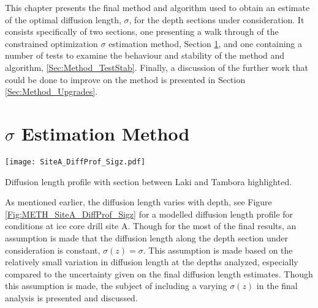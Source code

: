 \documentclass[../../CompleteThesis2/Complete_2ndDraft]{subfiles}
\begin{document}
This chapter presents the final method and algorithm used to obtain an estimate of the optimal diffusion length, $\sigma$, for the depth sections under consideration. It consists specifically of two sections, one presenting a walk through of the constrained optimization $\sigma$ estimation method, Section \ref{Sec:Method_SigmaMethod}, and one containing a number of tests to examine the behaviour and stability of the method and algorithm, \ref{Sec:Method_TestStab}. Finally, a discussion of the further work that could be done to improve on the method is presented in Section \ref{Sec:Method_Upgrades}.
\minitoc 

\section[$\sigma$ Estimation Method][$\sigma$ Estimation Method]{$\sigma$ Estimation Method}
\label{Sec:Method_SigmaMethod}
\begin{marginfigure}
	\centering
	\texttt{[image: SiteA\_DiffProf\_Sigz.pdf]}
	\caption[Diffusion length profile, LT]{\footnotesize Diffusion length profile with section between Laki and Tambora highlighted.}
	\label{Fig:METH_SiteA_DiffProf_Sigz}
\end{marginfigure}
As mentioned earlier, the diffusion length varies with depth, see Figure \ref{Fig:METH_SiteA_DiffProf_Sigz} for a modelled diffusion length profile for conditions at ice core drill site A. Though for the most of the final results, an assumption is made that the diffusion length along the depth section under consideration is constant, $\sigma(z)=\sigma$. This assumption is made based on the relatively small variation in diffusion length at the depths analyzed, especially compared to the uncertainty given on the final diffusion length estimates. Though this assumption is made, the subject of including a varying $\sigma(z)$ in the final analysis is presented and discussed.

\end{document}
